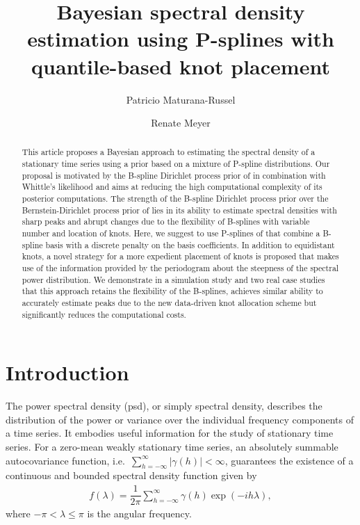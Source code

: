 \documentclass[twocolumn,final]{svjour3}
\title{Bayesian spectral density estimation using P-splines with quantile-based knot placement}
\author{Patricio Maturana-Russel \and Renate Meyer}
\institute{Patricio Maturana-Russel \at Department of Mathematical Sciences, Auckland
	University of Technology, Auckland, New Zealand \\ \email{p.maturana.russel@aut.ac.nz} 
\and Renate Meyer  \at Department of Statistics, University of Auckland, Auckland, New Zealand 
}
\begin{document}
\sloppy  

\maketitle


\begin{abstract}

This article  proposes a Bayesian approach to estimating the spectral density of a stationary time series using a prior based on a mixture of P-spline distributions.  Our proposal is motivated by the B-spline Dirichlet process prior of \cite{Edwards2019} in combination  with Whittle's likelihood and aims at  reducing the high computational complexity of its posterior computations. The strength of the B-spline Dirichlet process prior over the Bernstein-Dirichlet process prior of \cite{Choudhuri:2004}  lies in its ability to estimate spectral densities with sharp peaks and abrupt changes due to the flexibility of B-splines with variable number and location of knots. Here, we suggest to use P-splines of \cite{Eilers:1996} that combine a B-spline basis with a discrete penalty on the basis coefficients.  In addition to equidistant knots, a novel strategy for a more expedient placement of  knots is proposed that makes use of the information provided by the periodogram about the steepness of the spectral power distribution.
We demonstrate in a simulation study and two real  case studies that this approach retains the flexibility of the B-splines, achieves similar ability to accurately estimate peaks due to the new data-driven knot allocation scheme but significantly reduces the computational costs.

\end{abstract}


\section{Introduction}
The power spectral density (psd), or simply spectral density, describes the distribution of the power or variance over the individual frequency components of a time series.  It embodies useful information for the study of stationary time series.  For a zero-mean weakly stationary time series, an absolutely summable autocovariance function, i.e.\ $\sum_{h=-\infty}^{\infty} |\gamma(h)| <\infty$, guarantees the existence of a continuous and bounded spectral density function given by
\begin{align*}
f(\lambda) = \dfrac{1}{2\pi} \sum_{h = -\infty}^{\infty}\gamma(h)\exp\left(-i h \lambda \right), 
\end{align*}
where $-\pi < \lambda \leq \pi$ is the angular frequency.
\end{document}
